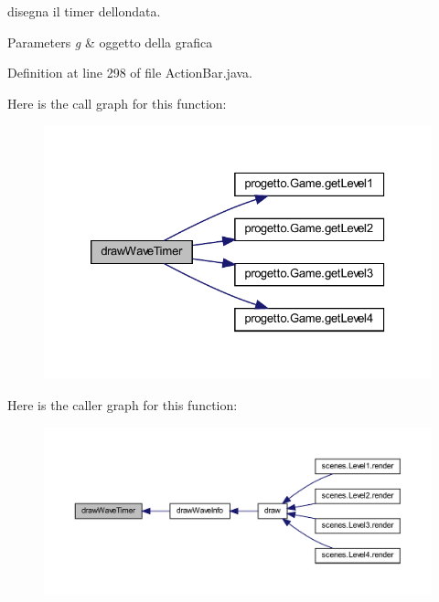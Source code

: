 disegna il timer dell\textquotesingle{}ondata. 


\begin{DoxyParams}{Parameters}
{\em g} & oggetto della grafica \\
\hline
\end{DoxyParams}


Definition at line 298 of file Action\+Bar.\+java.

Here is the call graph for this function\+:\nopagebreak
\begin{figure}[H]
\begin{center}
\leavevmode
\includegraphics[width=326pt]{classui_1_1_action_bar_a01f37d59ae4977fa55a1a6dd3e8bd543_cgraph}
\end{center}
\end{figure}
Here is the caller graph for this function\+:\nopagebreak
\begin{figure}[H]
\begin{center}
\leavevmode
\includegraphics[width=350pt]{classui_1_1_action_bar_a01f37d59ae4977fa55a1a6dd3e8bd543_icgraph}
\end{center}
\end{figure}
\mbox{\label{classui_1_1_action_bar_a6c5f59282a148a0d74bc5aa58d5ad307}} 
